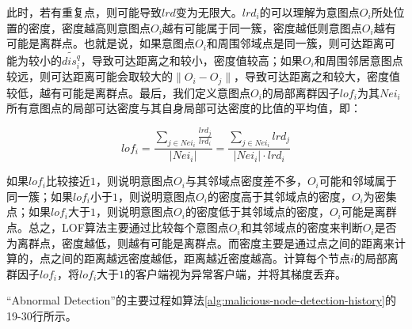 \documentclass[lettersize,journal]{IEEEtran}
\begin{document}
\begin{enumerate}
此时，若有重复点，则可能导致$lrd$变为无限大。$lrd_i$的可以理解为意图点$O_i$所处位置的密度，密度越高则意图点$O_i$越有可能属于同一簇，密度越低则意图点$O_i$越有可能是离群点。也就是说，如果意图点$O_i$和周围邻域点是同一簇，则可达距离可能为较小的$\widetilde{dis_i^q}$，导致可达距离之和较小，密度值较高；如果$O_i$和周围邻居意图点较远，则可达距离可能会取较大的$\|O_i-O_j\|$，导致可达距离之和较大，密度值较低，越有可能是离群点。最后，我们定义意图点$O_i$的局部离群因子$lof_i$为其$Nei_i$所有意图点的局部可达密度与其自身局部可达密度的比值的平均值，即：

\begin{equation}
    lof_i=\frac{\sum_{j\in Nei_i}\frac{lrd_j}{lrd_i}}{|Nei_i|}=\frac{\sum_{j\in Nei_i} lrd_j}{|Nei_i|\cdot lrd_i}
\end{equation}

如果$lof_i$比较接近$1$，则说明意图点$O_i$与其邻域点密度差不多，$O_i$可能和邻域属于同一簇；如果$lof_i$小于$1$，则说明意图点$O_i$的密度高于其邻域点的密度，$O_i$为密集点；如果$lof_i$大于$1$，则说明意图点$O_i$的密度低于其邻域点的密度，$O_i$可能是离群点。总之，LOF算法主要通过比较每个意图点$O_i$和其邻域点的密度来判断$O_i$是否为离群点，密度越低，则越有可能是离群点。而密度主要是通过点之间的距离来计算的，点之间的距离越远密度越低，距离越近密度越高。计算每个节点$i$的局部离群因子$lof_i$，将$lof_i$大于$1$的客户端视为异常客户端，并将其梯度丢弃。

“Abnormal Detection”的主要过程如算法\ref{alg:malicious-node-detection-history}的19-30行所示。






\end{enumerate}
\end{document}
